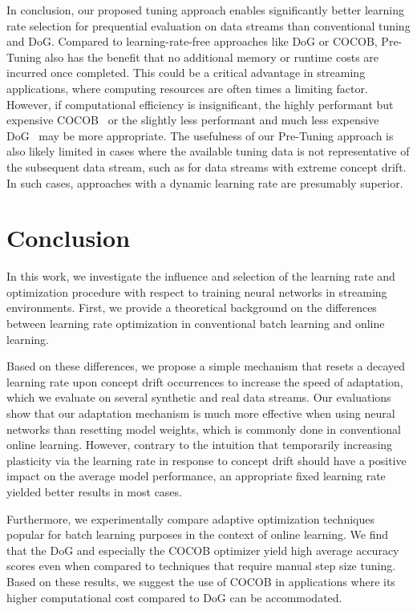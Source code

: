 \documentclass{article} %
\begin{document}
In conclusion, our proposed tuning approach enables significantly better learning rate selection for prequential evaluation on data streams than conventional tuning and DoG.
Compared to learning-rate-free approaches like DoG or COCOB, Pre-Tuning also has the benefit that no additional memory or runtime costs are incurred once completed.
This could be a critical advantage in streaming applications, where computing resources are often times a limiting factor.
However, if computational efficiency is insignificant, the highly performant but expensive COCOB~\citep{orabonaTrainingDeepNetworks2017} or the slightly less performant and much less expensive DoG~\citep{ivgiDoGSGDBest2023} may be more appropriate.
The usefulness of our Pre-Tuning approach is also likely limited in cases where the available tuning data is not representative of the subsequent data stream, such as for data streams with extreme concept drift.
In such cases, approaches with a dynamic learning rate are presumably superior.

\section{Conclusion}

In this work, we investigate the influence and selection of the learning rate and optimization procedure with respect to training neural networks in streaming environments.
First, we provide a theoretical background on the differences between learning rate optimization in conventional batch learning and online learning.

Based on these differences, we propose a simple mechanism that resets a decayed learning rate upon concept drift occurrences to increase the speed of adaptation, which we evaluate on several synthetic and real data streams.
Our evaluations show that our adaptation mechanism is much more effective when using neural networks than resetting model weights, which is commonly done in conventional online learning.
However, contrary to the intuition that temporarily increasing plasticity via the learning rate in response to concept drift should have a positive impact on the average model performance, an appropriate fixed learning rate yielded better results in most cases.

Furthermore, we experimentally compare adaptive optimization techniques popular for batch learning purposes in the context of online learning.
We find that the DoG and especially the COCOB optimizer yield high average accuracy scores even when compared to techniques that require manual step size tuning.
Based on these results, we suggest the use of COCOB in applications where its higher computational cost compared to DoG can be accommodated.
\end{document}
